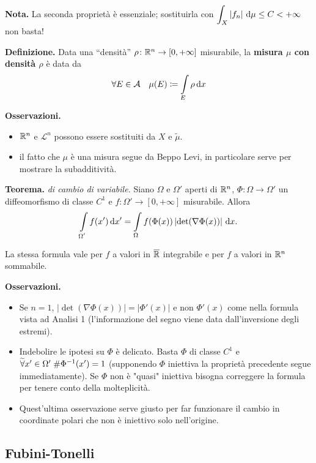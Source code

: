 \documentclass[a4paper, 12pt]{report}
\begin{document}
\textbf{Nota.}
La seconda proprietà è essenziale; sostituirla con $\displaystyle \int_X \left| f_n \right| \,\mathrm{d} \mu \leq C < + \infty$ non basta!

\textbf{Definizione.}
Data una ``densità'' $\rho \colon  \mathbb R^n \to [0,+\infty]$ misurabile, la \textbf{misura $\mu$ con densità $\rho$} è data da
$$
\forall E \in \mathcal A \quad \mu(E) \coloneqq \int\limits_{\mathclap{E}} \rho \dd x
$$ 

\textbf{Osservazioni.}
\begin{itemize}
	\item $\mathbb R^n$ e $\mathscr L^n$ possono essere sostituiti da $X$ e $\widetilde{\mu}$.
	\item il fatto che $\mu$ è una misura segue da Beppo Levi, in particolare serve per mostrare la subadditività.
\end{itemize}


\textbf{Teorema.}
\textit{di cambio di variabile.}
Siano $\Omega$ e $\Omega'$ aperti di $\mathbb R^n$, $\Phi \colon \Omega \to \Omega' $ un diffeomorfismo di classe $C^1$ e $f \colon \Omega' \to [0,+\infty]$ misurabile. Allora
$$
\int\limits_{\mathclap{\Omega'}} f(x') \dd x' = \int\limits_{\mathclap{\Omega}} f(\Phi(x)) \left| \det(\nabla \Phi(x)) \right| \dd x.
$$

La stessa formula vale per $f$ a valori in $\overline{\mathbb R}$ integrabile e per $f$ a valori in $\mathbb R^n$ sommabile.

\textbf{Osservazioni.}
\begin{itemize}
	\item Se $n = 1$, $\left| \det(\nabla \Phi(x)) \right| = \left| \Phi'(x) \right|$ e non $\Phi'(x)$ come nella formula vista ad Analisi 1 (l'informazione del segno viene data dall'inversione degli estremi).
	
	\item Indebolire le ipotesi su $\Phi$ è delicato. Basta $\Phi$ di classe $C^1$ e $\widetilde\forall x' \in \Omega' \; \# \Phi^{-1}(x') = 1$ (supponendo $\Phi$ iniettiva la proprietà precedente segue immediatamente).
	Se $\Phi$ non è "quasi" iniettiva bisogna correggere la formula per tenere conto della molteplicità.

	\item Quest'ultima osservazione serve giusto per far funzionare il cambio in coordinate polari che non è iniettivo solo nell'origine.
\end{itemize}

\subsection{Fubini-Tonelli}
\end{document}
